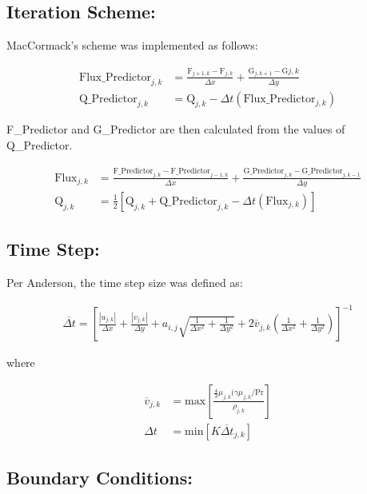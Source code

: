 \documentclass[10pt,a4paper]{article}
\begin{document}
\subsection*{Iteration Scheme:}

MacCormack's scheme was implemented as follows:

\begin{align*}
\text{Flux\_Predictor}_{j,k} & = \frac{\text{F}_{j+1,k} - \text{F}_{j,k}}{\Delta x} + \frac{ \text{G}_{j,k+1} - \text{G}{j,k} }{\Delta y} \\
\text{Q\_Predictor}_{j,k} & = \text{Q}_{j,k} - \Delta t (\text{Flux\_Predictor}_{j,k})
\end{align*}

F\_Predictor and G\_Predictor are then calculated from the values of Q\_Predictor.

\begin{align*}
\text{Flux}_{j,k} & = \frac{\text{F\_Predictor}_{j,k} - \text{F\_Predictor}_{j-1,k}}{\Delta x} + \frac{\text{G\_Predictor}_{j,k} - \text{G\_Predictor}_{j,k-1}}{\Delta y}\\
\text{Q}_{j,k} & = \frac{1}{2} \left[ \text{Q}_{j,k} + \text{Q\_Predictor}_{j,k} - \Delta t (\text{Flux}_{j,k}) \right]
\end{align*}


\subsection*{Time Step:}

Per Anderson, the time step size was defined as:

\begin{align*}
\overline{\Delta t} = \left[ \frac{|u_{j,k}|}{\Delta x} + \frac{|v_{j,k}|}{\Delta y} + a_{i,j} \sqrt{\frac{1}{\Delta x^2} + \frac{1}{\Delta y^2}} + 2 \overline{v}_{j,k} \left( \frac{1}{\Delta x^2} + \frac{1}{\Delta y^2} \right)   \right]^{-1}
\end{align*}

where

\begin{align*}
\overline{v}_{j,k} & = \text{max} \left[ \frac{ \frac{4}{3} \mu_{j,k} (\gamma \mu_{j,k} / \text{Pr} }{\rho_{j,k}} \right] \\
\Delta t & = \text{min} \left[ K \overline{\Delta t}_{j,k} \right]
\end{align*}


\subsection*{Boundary Conditions:}
\end{document}
